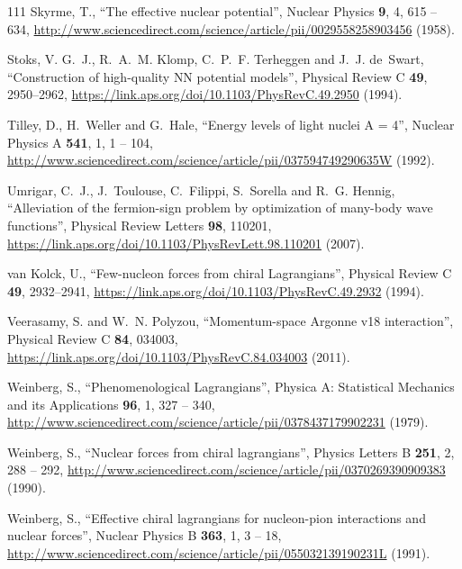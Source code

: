 \documentclass[12pt,letterpaper,UTF8]{report}
\begin{document}
{\begin{thebibliography}{111}
Skyrme, T., \enquote{The effective nuclear potential}, Nuclear Physics
  \textbf{9}, 4, 615 -- 634,
  \urlprefix\url{http://www.sciencedirect.com/science/article/pii/0029558258903456}
  (1958).

Stoks, V. G.~J., R.~A.~M. Klomp, C.~P.~F. Terheggen and J.~J. de~Swart,
  \enquote{Construction of high-quality {NN} potential models}, Physical Review
  C \textbf{49}, 2950--2962,
  \urlprefix\url{https://link.aps.org/doi/10.1103/PhysRevC.49.2950} (1994).

Tilley, D., H.~Weller and G.~Hale, \enquote{Energy levels of light nuclei {A =
  4}}, Nuclear Physics A \textbf{541}, 1, 1 -- 104,
  \urlprefix\url{http://www.sciencedirect.com/science/article/pii/037594749290635W}
  (1992).

Umrigar, C.~J., J.~Toulouse, C.~Filippi, S.~Sorella and R.~G. Hennig,
  \enquote{Alleviation of the fermion-sign problem by optimization of many-body
  wave functions}, Physical Review Letters \textbf{98}, 110201,
  \urlprefix\url{https://link.aps.org/doi/10.1103/PhysRevLett.98.110201}
  (2007).

van Kolck, U., \enquote{Few-nucleon forces from chiral {Lagrangians}}, Physical
  Review C \textbf{49}, 2932--2941,
  \urlprefix\url{https://link.aps.org/doi/10.1103/PhysRevC.49.2932} (1994).

Veerasamy, S. and W.~N. Polyzou, \enquote{Momentum-space {Argonne} v18
  interaction}, Physical Review C \textbf{84}, 034003,
  \urlprefix\url{https://link.aps.org/doi/10.1103/PhysRevC.84.034003} (2011).

Weinberg, S., \enquote{Phenomenological {Lagrangians}}, Physica A: Statistical
  Mechanics and its Applications \textbf{96}, 1, 327 -- 340,
  \urlprefix\url{http://www.sciencedirect.com/science/article/pii/0378437179902231}
  (1979).

Weinberg, S., \enquote{Nuclear forces from chiral lagrangians}, Physics Letters
  B \textbf{251}, 2, 288 -- 292,
  \urlprefix\url{http://www.sciencedirect.com/science/article/pii/0370269390909383}
  (1990).

Weinberg, S., \enquote{Effective chiral lagrangians for nucleon-pion
  interactions and nuclear forces}, Nuclear Physics B \textbf{363}, 1, 3 -- 18,
  \urlprefix\url{http://www.sciencedirect.com/science/article/pii/055032139190231L}
  (1991).


\end{thebibliography}}
\end{document}
